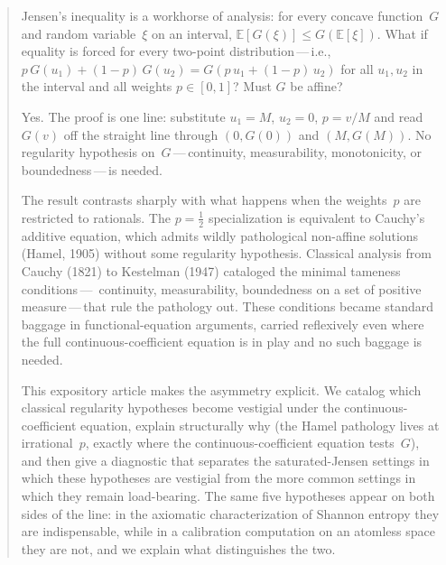 \documentclass{article}
\theoremstyle{plain}
\theoremstyle{definition}
\newcommand{\E}{\mathbb{E}}
\begin{document}
\author{Double Blind No Name}

\maketitle

\begin{abstract}
Jensen's inequality is a workhorse of analysis: for every concave
function~$G$ and random variable~$\xi$ on an interval,
$\E[G(\xi)]\le G(\E[\xi])$. What if equality is forced for every
two-point distribution\,---\,i.e.,
$p\,G(u_1)+(1-p)\,G(u_2)=G(p\,u_1+(1-p)\,u_2)$ for all $u_1,u_2$ in
the interval and all weights $p\in[0,1]$? Must $G$ be affine?

Yes. The proof is one line: substitute $u_1=M$, $u_2=0$, $p=v/M$ and
read $G(v)$ off the straight line through $(0,G(0))$ and $(M,G(M))$.
No regularity hypothesis on~$G$\,---\,continuity, measurability,
monotonicity, or boundedness\,---\,is needed.

The result contrasts sharply with what happens when the weights~$p$
are restricted to rationals. The $p=\tfrac{1}{2}$ specialization is
equivalent to Cauchy's additive equation, which admits wildly
pathological non-affine solutions (Hamel, 1905) without some
regularity hypothesis. Classical analysis from Cauchy (1821) to
Kestelman (1947) cataloged the minimal tameness conditions\,---\,%
continuity, measurability, boundedness on a set of positive
measure\,---\,that rule the pathology out. These conditions became
standard baggage in functional-equation arguments, carried reflexively
even where the full continuous-coefficient equation is in play and no
such baggage is needed.

This expository article makes the asymmetry explicit. We catalog which
classical regularity hypotheses become vestigial under the
continuous-coefficient equation, explain structurally why (the Hamel
pathology lives at irrational~$p$, exactly where the continuous-coefficient
equation tests~$G$), and then give a diagnostic that separates the
saturated-Jensen settings in which these hypotheses are vestigial from
the more common settings in which they remain load-bearing. The same
five hypotheses appear on both sides of the line: in the axiomatic
characterization of Shannon entropy they are indispensable, while in a
calibration computation on an atomless space they are not, and we
explain what distinguishes the two.
\end{abstract}
\end{document}
